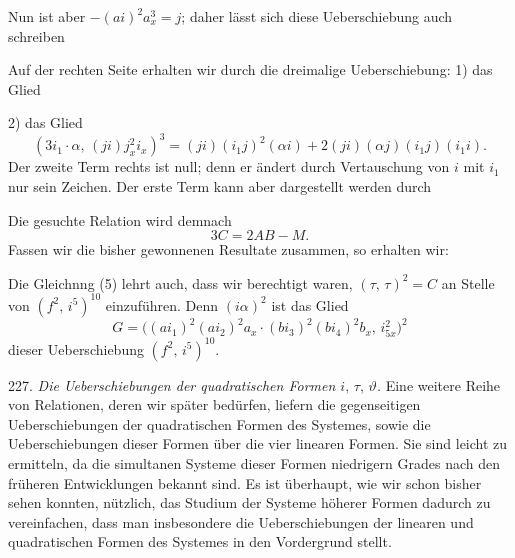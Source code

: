 
Nun ist aber $-(ai)^2a_x^3 = j$; daher lässt sich diese Ueberschiebung auch schreiben


Auf der rechten Seite erhalten wir durch die dreimalige Ueberschiebung: 1) das Glied


2) das Glied
\[
(3i_1\cdot\alpha,\,(ji)j_x^2i_x)^3 = (ji)(i_1j)^2(\alpha i) + 2(ji)(\alpha j)(i_1j)(i_1i).
\]
Der zweite Term rechts ist null; denn er ändert durch Vertauschung von $i$ mit $i_1$ nur sein Zeichen. Der erste Term kann aber dargestellt werden durch


Die gesuchte Relation wird demnach
\[
3C = 2AB - M.
\]
Fassen wir die bisher gewonnenen Resultate zusammen, so erhalten wir:




Die Gleichnng (5) lehrt auch, dass wir berechtigt waren, $(\tau,\,\tau)^2 = C$ an Stelle von $(f^2,\,i^5)^{10}$ einzuführen. %
Denn $(i\alpha)^2$ ist das Glied
\[
G = \big((ai_1)^2(ai_2)^2a_x\cdot(bi_3)^2(bi_4)^2b_x,\,i_{5x}^2\big)^2
\]
dieser Ueberschiebung $(f^2,\,i^5)^{10}$.

227. \textit{Die Ueberschiebungen der quadratischen Formen $i,\,\tau,\,\vartheta$.} Eine weitere Reihe von Relationen, deren wir später bedürfen, liefern die gegenseitigen Ueberschiebungen der quadratischen Formen des Systemes, sowie die Ueberschiebungen dieser Formen über die vier linearen Formen. Sie sind leicht zu ermitteln, da die simultanen Systeme dieser Formen niedrigern Grades nach den früheren Entwicklungen bekannt sind. Es ist überhaupt, wie wir schon bisher sehen konnten, nützlich, das Studium der Systeme höherer Formen dadurch zu vereinfachen, dass man insbesondere die Ueberschiebungen der linearen und quadratischen Formen des Systemes in den Vordergrund stellt.

